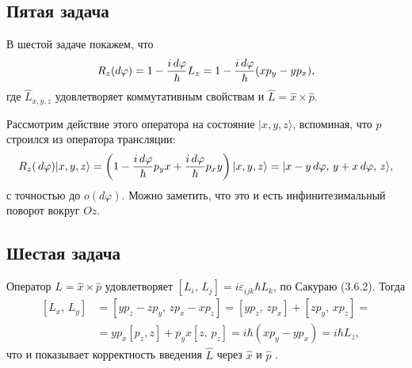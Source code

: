 \subsection*{Пятая задача}

В шестой задаче покажем, что
\begin{equation*}
    R_z (d \varphi) = 1 - \frac{i \, d \varphi}{\hbar} L_z = 
    1 - \frac{i \, d \varphi}{\hbar} (x p_y - y p_x),
\end{equation*}
где $\hat{L}_{x,y,z}$ удовлетворяет коммутативным свойствам и $\hat{L} = \hat{x} \times  \hat{p}$. 

Рассмотрим действие этого оператора на состояние $| x,y,z\rangle $, вспоминая, что $\hat{p}$ строился из оператора трансляции:
\begin{equation*}
    R_z (\, d \varphi) | x,y,z\rangle = \left(
        1 - \frac{i \, d \varphi}{\hbar} p_y x + \frac{i \, d \varphi}{\hbar} p_x y
    \right) | x,y,z\rangle = | x - y \, d \varphi,\, y + x \, d \varphi,\, z\rangle,
\end{equation*}
с точностью до $o(d \varphi)$. Можно заметить, что это и есть инфинитезимальный поворот вокруг $Oz$. 



\subsection*{Шестая задача}

Оператор $L = \hat{x} \times  \hat{p}$ удовлетворяет $\left[L_i,\, L_j \right]= i \varepsilon_{i j k} \hbar L_k$, по Сакураю (3.6.2). Тогда
\begin{align*}
    \left[L_x,\, L_y\right] &= \left[
        y p_z - z p_y,\, z p_x - x p_z
    \right] = 
    \left[y p_z,\, z p_x\right] + \left[z p_y,\, x p_z\right] 
    = \\ &=
    y p_x \left[p_z, z\right] + p_y x [z,\, p_z] = i \hbar \left(x p_y - y p_x\right) = i \hbar L_z,
\end{align*}
что и показывает корректность введения $\hat{L}$ через $\hat{x}$ и $\hat{p}$ .

